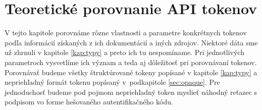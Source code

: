 \chapter{Teoretické porovnanie API tokenov}

\label{kap:teoreticke} %

V tejto kapitole porovnáme rôzne vlastnosti a parametre konkrétnych tokenov podľa informácií získaných z ich dokumentácií a iných zdrojov. Niektoré dáta sme už zhrnuli v kapitole \ref{kap:typy} a preto ich tu nespomíname. Pri jednotlivých parametroch vysvetlíme ich význam a teda aj dôležitosť pri porovnávaní tokenov. Porovnávať budeme všetky štruktúrované tokeny popísané v kapitole \ref{kap:typy} a nepriehľadný formát tokenu popísaný v~podkapitole \ref{sec:opaque}. Pre jednoduchosť budeme pod pojmom nepriehľadný token myslieť náhodný reťazec s podpisom vo forme hešovaného autentifikačného kódu. 

